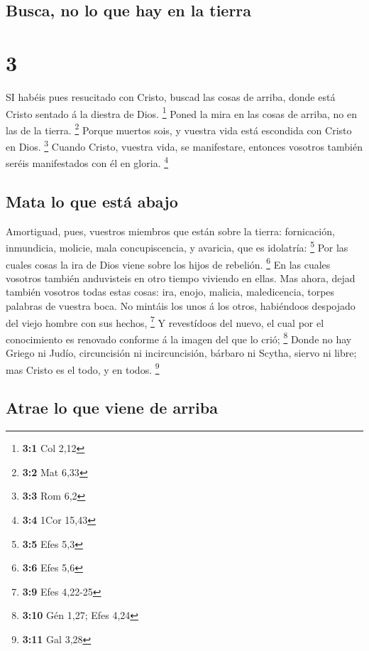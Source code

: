 \hypertarget{busca-no-lo-que-hay-en-la-tierra}{%
\subsection{Busca, no lo que hay en la
tierra}\label{busca-no-lo-que-hay-en-la-tierra}}

\hypertarget{section-2}{%
\section{3}\label{section-2}}

 SI habéis pues resucitado con Cristo, buscad las cosas de
arriba, donde está Cristo sentado á la diestra de Dios. \footnote{\textbf{3:1}
  Col 2,12}  Poned la mira en las cosas de arriba, no en las
de la tierra. \footnote{\textbf{3:2} Mat 6,33}  Porque
muertos sois, y vuestra vida está escondida con Cristo en Dios.
\footnote{\textbf{3:3} Rom 6,2}  Cuando Cristo, vuestra
vida, se manifestare, entonces vosotros también seréis manifestados con
él en gloria. \footnote{\textbf{3:4} 1Cor 15,43}

\hypertarget{mata-lo-que-estuxe1-abajo}{%
\subsection{Mata lo que está abajo}\label{mata-lo-que-estuxe1-abajo}}

 Amortiguad, pues, vuestros miembros que están sobre la
tierra: fornicación, inmundicia, molicie, mala concupiscencia, y
avaricia, que es idolatría: \footnote{\textbf{3:5} Efes 5,3}
 Por las cuales cosas la ira de Dios viene sobre los hijos
de rebelión. \footnote{\textbf{3:6} Efes 5,6}  En las cuales
vosotros también anduvisteis en otro tiempo viviendo en ellas.
 Mas ahora, dejad también vosotros todas estas cosas: ira,
enojo, malicia, maledicencia, torpes palabras de vuestra boca.
 No mintáis los unos á los otros, habiéndoos despojado del
viejo hombre con sus hechos, \footnote{\textbf{3:9} Efes 4,22-25}
 Y revestídoos del nuevo, el cual por el conocimiento es
renovado conforme á la imagen del que lo crió; \footnote{\textbf{3:10}
  Gén 1,27; Efes 4,24}  Donde no hay Griego ni Judío,
circuncisión ni incircuncisión, bárbaro ni Scytha, siervo ni libre; mas
Cristo es el todo, y en todos. \footnote{\textbf{3:11} Gal 3,28}

\hypertarget{atrae-lo-que-viene-de-arriba}{%
\subsection{Atrae lo que viene de
arriba}\label{atrae-lo-que-viene-de-arriba}}


